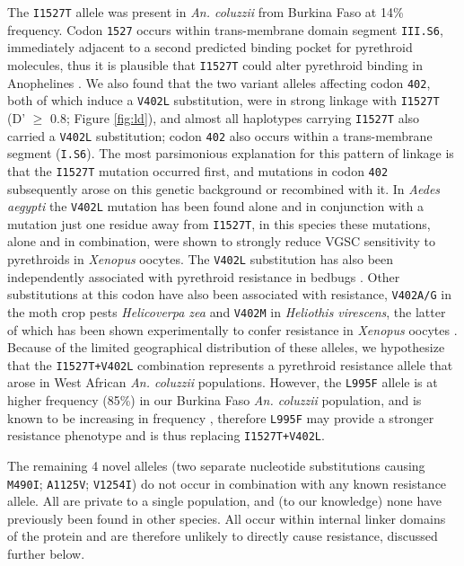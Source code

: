 \documentclass[a4paper,11pt,abstracton,hidelinks]{scrartcl}
\begin{document}
%
The \texttt{I1527T} allele was present in \textit{An. coluzzii} from Burkina Faso at 14\% frequency.
%
Codon \texttt{1527} occurs within trans-membrane domain segment \texttt{III.S6}, immediately adjacent to a second predicted binding pocket for pyrethroid molecules, thus it is plausible that \texttt{I1527T} could alter pyrethroid binding in Anophelines \cite{Dong2014}.
%
We also found that the two variant alleles affecting codon \texttt{402}, both of which induce a \texttt{V402L} substitution, were in strong linkage with \texttt{I1527T} (D' $\geq$ 0.8; Figure \ref{fig:ld}), and almost all haplotypes carrying \texttt{I1527T} also carried a \texttt{V402L} substitution; codon \texttt{402} also occurs within a trans-membrane segment (\texttt{I.S6}).
%
The most parsimonious explanation for this pattern of linkage is that the \texttt{I1527T} mutation occurred first, and mutations in codon \texttt{402} subsequently arose on this genetic background or recombined with it.
%
In \textit{Aedes aegypti} the \texttt{V402L} mutation has been found alone and in conjunction with a mutation just one residue away from \texttt{I1527T}, in this species these mutations, alone and in combination, were shown to strongly reduce VGSC sensitivity to pyrethroids in \textit{Xenopus} oocytes.
%
The \texttt{V402L} substitution has also been independently associated with pyrethroid resistance in bedbugs \cite{Yoon2008}.
%
Other substitutions at this codon have also been associated with resistance, \texttt{V402A/G} in the moth crop pests \emph{Helicoverpa zea} \cite{Hopkins2010} and \texttt{V402M} in \emph{Heliothis virescens}, the latter of which has been shown experimentally to confer resistance in \textit{Xenopus} oocytes \cite{Park1997, Lee2013}.
%
Because of the limited geographical distribution of these alleles, we hypothesize that the \texttt{I1527T+V402L} combination represents a pyrethroid resistance allele that arose in West African \textit{An. coluzzii} populations.
%
However, the \texttt{L995F} allele is at higher frequency (85\%) in our Burkina Faso \textit{An. coluzzii} population, and is known to be increasing in frequency \cite{Toe2014}, therefore \texttt{L995F} may provide a stronger resistance phenotype and is thus replacing \texttt{I1527T+V402L}.


%
The remaining 4 novel alleles (two separate nucleotide substitutions causing \texttt{M490I}; \texttt{A1125V}; \texttt{V1254I}) do not occur in combination with any known resistance allele.
%
All are private to a single population, and (to our knowledge) none have previously been found in other species.
%
All occur within internal linker domains of the protein and are therefore unlikely to directly cause resistance, discussed further below.
\end{document}

